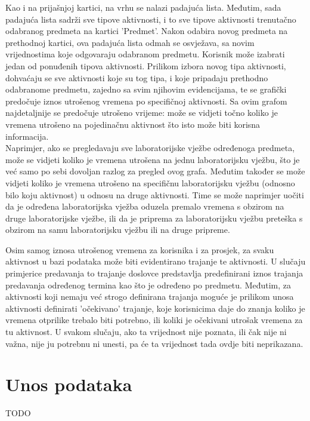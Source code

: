 \documentclass[times, utf8, zavrsni]{fer}
\begin{document}
Kao i na prijašnjoj kartici, na vrhu se nalazi padajuća lista. Međutim, sada padajuća lista sadrži sve tipove aktivnosti, i to sve tipove aktivnosti trenutačno odabranog predmeta na kartici 'Predmet'. Nakon odabira novog predmeta na prethodnoj kartici, ova padajuća lista odmah se osvježava, sa novim vrijednostima koje odgovaraju odabranom predmetu. Korisnik može izabrati jedan od ponuđenih tipova aktivnosti. Prilikom izbora novog tipa aktivnosti, dohvaćaju se sve aktivnosti koje su tog tipa, i koje pripadaju prethodno odabranome predmetu, zajedno sa svim njihovim evidencijama, te se grafički predočuje iznos utrošenog vremena po specifičnoj aktivnosti. Sa ovim grafom najdetaljnije se predočuje utrošeno vrijeme: može se vidjeti točno koliko je vremena utrošeno na pojedinačnu aktivnost što isto može biti korisna informacija. \\

Naprimjer, ako se pregledavaju sve laboratorijske vježbe određenoga predmeta, može se vidjeti koliko je vremena utrošena na jednu laboratorijsku vježbu, što je već samo po sebi dovoljan razlog za pregled ovog grafa. Međutim također se može vidjeti koliko je vremena utrošeno na specifičnu laboratorijsku vježbu (odnosno bilo koju aktivnost) u odnosu na druge aktivnosti. Time se može naprimjer uočiti da je određena laboratorijska vježba oduzela premalo vremena s obzirom na druge laboratorijske vježbe, ili da je priprema za laboratorijsku vježbu preteška s obzirom na samu laboratorijsku vježbu ili na druge pripreme.

Osim samog iznosa utrošenog vremena za korisnika i za prosjek, za svaku aktivnost u bazi podataka može biti evidentirano trajanje te aktivnosti. U slučaju primjerice predavanja to trajanje doslovce predstavlja predefinirani iznos trajanja predavanja određenog termina kao što je određeno po predmetu. Međutim, za aktivnosti koji nemaju već strogo definirana trajanja moguće je prilikom unosa aktivnosti definirati 'očekivano' trajanje, koje korisnicima daje do znanja koliko je vremena otprilike trebalo biti potrebno, ili koliki je očekivani utrošak vremena za tu aktivnost. U svakom slučaju, ako ta vrijednost nije poznata, ili čak nije ni važna, nije ju potrebnu ni unesti, pa će ta vrijednost tada ovdje biti neprikazana.

\section{Unos podataka}

TODO
\end{document}
